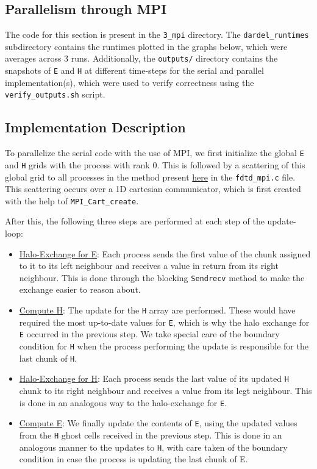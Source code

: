 \documentclass[a4paper,10pt]{article}
\begin{document}
\begin{multicols}{2}
\section{Parallelism through MPI}
\label{sec:3_mpi}
The code for this section is present in the \verb|3_mpi| directory. The \verb|dardel_runtimes| subdirectory contains the runtimes plotted in the graphs below, which were averages across 3 runs. Additionally, the \verb|outputs/| directory contains the snapshots of \verb|E| and \verb|H| at different time-steps for the serial and parallel implementation(s), which were used to verify correctness using the \verb|verify_outputs.sh| script.

\subsection{Implementation Description}
To parallelize the serial code with the use of MPI, we first initialize the global \verb|E| and \verb|H| grids with the process with rank 0. This is followed by a scattering of this global grid to all processes in the method present \href{https://github.com/paulmyr/DD2356-MethodsHPC/blob/master/5_project/3_mpi/fdtd_mpi.c#L25}{here} in the \verb|fdtd_mpi.c| file. This scattering occurs over a 1D cartesian communicator, which is first created with the help tof \verb|MPI_Cart_create|. 

After this, the following three steps are performed at each step of the update-loop:
\begin{itemize}
\item \underline{Halo-Exchange for E}: Each process sends the first value of the chunk assigned to it to its left neighbour and receives a value in return from its right neighbour. This is done through the blocking \verb|Sendrecv| method to make the exchange easier to reason about. 
\item \underline{Compute H}: The update for the \verb|H| array are performed. These would have required the most up-to-date values for \verb|E|, which is why the halo exchange for \verb|E| occurred in the previous step. We take special care of the boundary condition for \verb|H| when the process performing the update is responsible for the last chunk of \verb|H|.
\item \underline{Halo-Exchange for H}: Each process sends the last value of its updated \verb|H| chunk to its right neighbour and receives a value from its legt neighbour. This is done in an analogous way to the halo-exchange for \verb|E|. 
\item \underline{Compute E}: We finally update the contents of \verb|E|, using the updated values from the \verb|H| ghost cells received in the previous step. This is done in an analogous manner to the updates to \verb|H|, with care taken of the boundary condition in case the process is updating the last chunk of E. 
\end{itemize}


\end{multicols}
\end{document}

